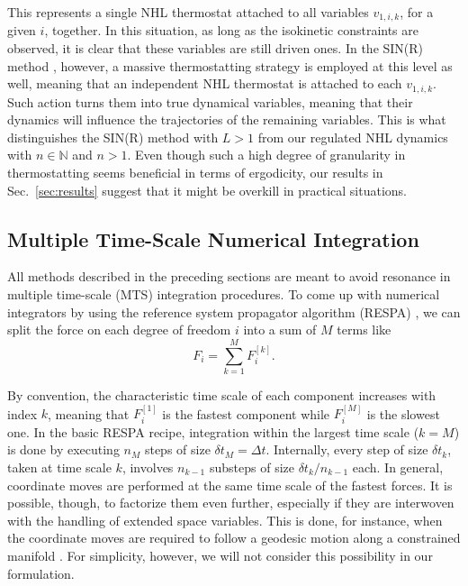 \documentclass[
aip,
jcp,
reprint,
]{revtex4-1}
\begin{document}
This represents a single NHL thermostat attached to all variables $v_{1,i,k}$, for a given $i$, together.
In this situation, as long as the isokinetic constraints are observed, it is clear that these variables are still driven ones.
In the SIN(R) method \cite{Leimkuhler_2013}, however, a massive thermostatting strategy is employed at this level as well, meaning that an independent NHL thermostat is attached to each $v_{1,i,k}$.
Such action turns them into true dynamical variables, meaning that their dynamics will influence the trajectories of the remaining variables.
This is what distinguishes the SIN(R) method with $L>1$ from our regulated NHL dynamics with $n \in \mathbb{N}$ and $n > 1$.
Even though such a high degree of granularity in thermostatting seems beneficial in terms of ergodicity, our results in Sec.~\ref{sec:results} suggest that it might be overkill in practical situations.

\subsection{Multiple Time-Scale Numerical Integration}
\label{sec: numerical integration}

All methods described in the preceding sections are meant to avoid resonance in multiple time-scale (MTS) integration procedures.
To come up with numerical integrators by using the reference system propagator algorithm (RESPA) \cite{Tuckerman_1992}, we can split the force on each degree of freedom $i$ into a sum of $M$ terms like
\begin{equation*}
F_i = \sum_{k=1}^M F_i^{[k]}.
\end{equation*}

By convention, the characteristic time scale of each component increases with index $k$, meaning that $F_i^{[1]}$ is the fastest component while $F_i^{[M]}$ is the slowest one.
In the basic RESPA recipe, integration within the largest time scale ($k=M$) is done by executing $n_M$ steps of size $\delta t_M = \Delta t$.
Internally, every step of size $\delta t_k$, taken at time scale $k$, involves $n_{k-1}$ substeps of size $\delta t_k/n_{k-1}$ each.
In general, coordinate moves are performed at the same time scale of the fastest forces.
It is possible, though, to factorize them even further, especially if they are interwoven with the handling of extended space variables.
This is done, for instance, when the coordinate moves are required to follow a geodesic motion along a constrained manifold \cite{Leimkuhler_2016b}.
For simplicity, however, we will not consider this possibility in our formulation.
\end{document}
